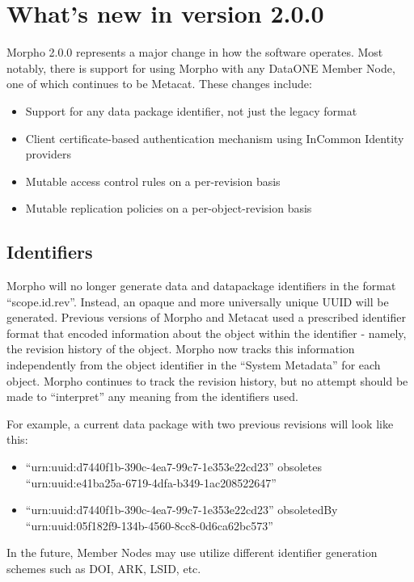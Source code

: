\section{What's new in version 2.0.0}

Morpho 2.0.0 represents a major change in how the software operates. 
Most notably, there is support for using Morpho with any 
DataONE Member Node, one of which continues to be Metacat.
These changes include:
\begin{itemize}
 \item Support for any data package identifier, not just the legacy format
 \item Client certificate-based authentication mechanism using InCommon Identity providers
 \item Mutable access control rules on a per-revision basis
 \item Mutable replication policies on a per-object-revision basis
\end{itemize}

\subsection{Identifiers}

Morpho will no longer generate data and datapackage identifiers
 in the format ``scope.id.rev''. Instead, an opaque and more universally unique
UUID will be generated. 
Previous versions of Morpho and Metacat used
a prescribed identifier format that encoded information about the object
within the identifier - namely, the revision history of the object.
Morpho now tracks this information independently from the object identifier
in the ``System Metadata'' for each object. Morpho continues to track the revision
history, but no attempt should be made to ``interpret'' any meaning from the identifiers used.

For example, a current data package with two previous revisions will look like this:
\begin{itemize}
 \item ``urn:uuid:d7440f1b-390c-4ea7-99c7-1e353e22cd23'' obsoletes ``urn:uuid:e41ba25a-6719-4dfa-b349-1ac208522647''
 \item ``urn:uuid:d7440f1b-390c-4ea7-99c7-1e353e22cd23''  obsoletedBy ``urn:uuid:05f182f9-134b-4560-8cc8-0d6ca62bc573'' 
\end{itemize}

In the future, Member Nodes may use utilize different identifier generation schemes
such as DOI, ARK, LSID, etc.

